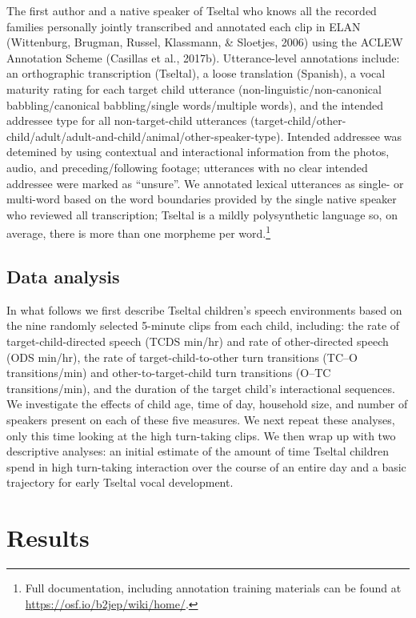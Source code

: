 \documentclass[floatsintext,man]{apa6}
\theoremstyle{definition}
\theoremstyle{definition}
\theoremstyle{definition}
\theoremstyle{remark}
\begin{document}
The first author and a native speaker of Tseltal who knows all the
recorded families personally jointly transcribed and annotated each clip
in ELAN (Wittenburg, Brugman, Russel, Klassmann, \& Sloetjes, 2006)
using the ACLEW Annotation Scheme (Casillas et al., 2017b).
Utterance-level annotations include: an orthographic transcription
(Tseltal), a loose translation (Spanish), a vocal maturity rating for
each target child utterance (non-linguistic/non-canonical
babbling/canonical babbling/single words/multiple words), and the
intended addressee type for all non-target-child utterances
(target-child/other-child/adult/adult-and-child/animal/other-speaker-type).
Intended addressee was detemined by using contextual and interactional
information from the photos, audio, and preceding/following footage;
utterances with no clear intended addressee were marked as
\enquote{unsure}. We annotated lexical utterances as single- or
multi-word based on the word boundaries provided by the single native
speaker who reviewed all transcription; Tseltal is a mildly
polysynthetic language so, on average, there is more than one morpheme
per word.\footnote{Full documentation, including annotation training
  materials can be found at \url{https://osf.io/b2jep/wiki/home/}.}

\subsection{Data analysis}\label{methods-analysisinfo}

In what follows we first describe Tseltal children's speech environments
based on the nine randomly selected 5-minute clips from each child,
including: the rate of target-child-directed speech (TCDS min/hr) and
rate of other-directed speech (ODS min/hr), the rate of
target-child-to-other turn transitions (TC--O transitions/min) and
other-to-target-child turn transitions (O--TC transitions/min), and the
duration of the target child's interactional sequences. We investigate
the effects of child age, time of day, household size, and number of
speakers present on each of these five measures. We next repeat these
analyses, only this time looking at the high turn-taking clips. We then
wrap up with two descriptive analyses: an initial estimate of the amount
of time Tseltal children spend in high turn-taking interaction over the
course of an entire day and a basic trajectory for early Tseltal vocal
development.

\section{Results}\label{results}
\end{document}
